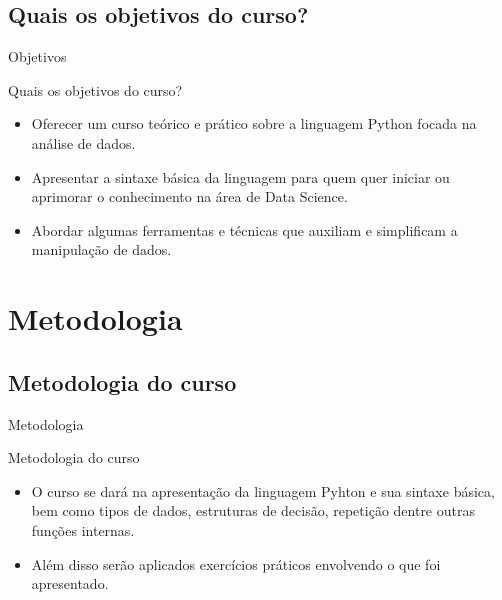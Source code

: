 \subsection{Quais os objetivos do curso?}
	\begin{frame}{Objetivos}
		
		\begin{block}{Quais os objetivos do curso?}
			\begin{itemize}[<+->]
				
				\item Oferecer um curso teórico e prático sobre a linguagem Python focada na análise de dados.
				
				\item Apresentar a sintaxe básica da linguagem para quem quer iniciar ou aprimorar o conhecimento na área de Data Science.
				
				\item Abordar algumas ferramentas e técnicas que auxiliam e simplificam a manipulação de dados. 
			\end{itemize}
			
		\end{block}
		
	\end{frame}

\section{Metodologia}
\subsection{Metodologia do curso}
	\begin{frame}{Metodologia}
		\begin{block}{Metodologia do curso}
			\begin{itemize}[<+->]
				\item O curso se dará na apresentação da linguagem Pyhton e sua sintaxe básica, bem como tipos de dados, estruturas de decisão, repetição dentre outras funções internas.
				
				\item Além disso serão aplicados exercícios práticos envolvendo o que foi apresentado.
			\end{itemize}
		\end{block}
	\end{frame}

